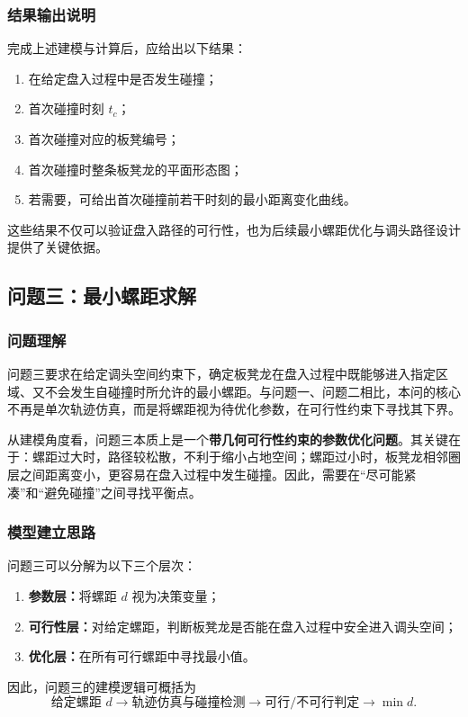 \documentclass[12pt,a4paper]{ctexart}
\begin{document}
\subsubsection{结果输出说明}
完成上述建模与计算后，应给出以下结果：
\begin{enumerate}
    \item 在给定盘入过程中是否发生碰撞；
    \item 首次碰撞时刻 $t_c$；
    \item 首次碰撞对应的板凳编号；
    \item 首次碰撞时整条板凳龙的平面形态图；
    \item 若需要，可给出首次碰撞前若干时刻的最小距离变化曲线。
\end{enumerate}

\noindent 这些结果不仅可以验证盘入路径的可行性，也为后续最小螺距优化与调头路径设计提供了关键依据。
\subsection{问题三：最小螺距求解}

\subsubsection{问题理解}
问题三要求在给定调头空间约束下，确定板凳龙在盘入过程中既能够进入指定区域、又不会发生自碰撞时所允许的最小螺距。与问题一、问题二相比，本问的核心不再是单次轨迹仿真，而是将螺距视为待优化参数，在可行性约束下寻找其下界。

从建模角度看，问题三本质上是一个\textbf{带几何可行性约束的参数优化问题}。其关键在于：螺距过大时，路径较松散，不利于缩小占地空间；螺距过小时，板凳龙相邻圈层之间距离变小，更容易在盘入过程中发生碰撞。因此，需要在“尽可能紧凑”和“避免碰撞”之间寻找平衡点。

\subsubsection{模型建立思路}
问题三可以分解为以下三个层次：

\begin{enumerate}
    \item \textbf{参数层：}将螺距 $d$ 视为决策变量；
    \item \textbf{可行性层：}对给定螺距，判断板凳龙是否能在盘入过程中安全进入调头空间；
    \item \textbf{优化层：}在所有可行螺距中寻找最小值。
\end{enumerate}

因此，问题三的建模逻辑可概括为
\[
\text{给定螺距 } d \longrightarrow \text{轨迹仿真与碰撞检测} \longrightarrow \text{可行/不可行判定} \longrightarrow \min d.
\]
\end{document}
